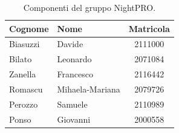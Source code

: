 \documentclass[a4paper, 11pt, oneside]{scrartcl}
\begin{document}
\begin{table}[H]
    \centering
    \renewcommand{\arraystretch}{1.2}
    \begin{tabular}{@{}llc@{}}
        \toprule
        \textbf{Cognome} & \textbf{Nome}   & \textbf{Matricola} \\
        \midrule
        Biasuzzi         & Davide          & 2111000            \\
        Bilato           & Leonardo        & 2071084            \\
        Zanella          & Francesco       & 2116442            \\
        Romascu          & Mihaela-Mariana & 2079726            \\
        Perozzo          & Samuele         & 2110989            \\
        Ponso            & Giovanni        & 2000558            \\
        \bottomrule
    \end{tabular}
    \caption{Componenti del gruppo NightPRO.}
\end{table}

\newpage


\newpage


\newpage


\newpage


\newpage


\newpage


\newpage

\end{document}
